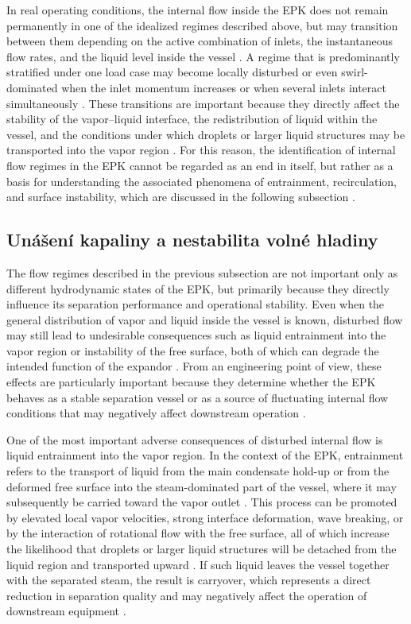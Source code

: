 In real operating conditions, the internal flow inside the EPK does not remain permanently in one of the idealized regimes described above, but may transition between them depending on the active combination of inlets, the instantaneous flow rates, and the liquid level inside the vessel \cite{IshiiHibiki2011,LeeEtAl2019}. A regime that is predominantly stratified under one load case may become locally disturbed or even swirl-dominated when the inlet momentum increases or when several inlets interact simultaneously \cite{SafikhaniEtAl2018,LeeEtAl2019}. These transitions are important because they directly affect the stability of the vapor--liquid interface, the redistribution of liquid within the vessel, and the conditions under which droplets or larger liquid structures may be transported into the vapor region \cite{IshiiHibiki2011,HarunEtAl2019}. For this reason, the identification of internal flow regimes in the EPK cannot be regarded as an end in itself, but rather as a basis for understanding the associated phenomena of entrainment, recirculation, and surface instability, which are discussed in the following subsection \cite{IshiiHibiki2011}.

\subsection{Unášení kapaliny a nestabilita volné hladiny}

The flow regimes described in the previous subsection are not important only as different hydrodynamic states of the EPK, but primarily because they directly influence its separation performance and operational stability. Even when the general distribution of vapor and liquid inside the vessel is known, disturbed flow may still lead to undesirable consequences such as liquid entrainment into the vapor region or instability of the free surface, both of which can degrade the intended function of the expandor \cite{IshiiHibiki2011,LeeEtAl2019}. From an engineering point of view, these effects are particularly important because they determine whether the EPK behaves as a stable separation vessel or as a source of fluctuating internal flow conditions that may negatively affect downstream operation \cite{IshiiHibiki2011}.

One of the most important adverse consequences of disturbed internal flow is liquid entrainment into the vapor region. In the context of the EPK, entrainment refers to the transport of liquid from the main condensate hold-up or from the deformed free surface into the steam-dominated part of the vessel, where it may subsequently be carried toward the vapor outlet \cite{IshiiHibiki2011}. This process can be promoted by elevated local vapor velocities, strong interface deformation, wave breaking, or by the interaction of rotational flow with the free surface, all of which increase the likelihood that droplets or larger liquid structures will be detached from the liquid region and transported upward \cite{LeeEtAl2019,CarusoEtAl2016}. If such liquid leaves the vessel together with the separated steam, the result is carryover, which represents a direct reduction in separation quality and may negatively affect the operation of downstream equipment \cite{IshiiHibiki2011,HarunEtAl2019}.

